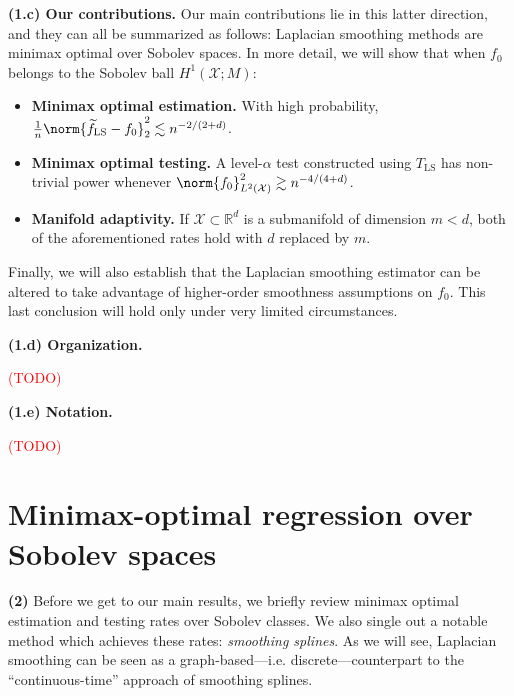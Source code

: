 \documentclass{article}
\newcommand{\Reals}{\mathbb{R}}
\newcommand{\1}{\mathbf{1}}
\newcommand{\Rd}{\Reals^d}
\newcommand{\Xset}{\mathcal{X}}
\newcommand{\Leb}{L}
\newcommand{\mc}[1]{\mathcal{#1}}
\newcommand{\wt}[1]{\widetilde{#1}}
\newcommand{\LS}{\mathrm{LS}}
\theoremstyle{alden}
\theoremstyle{aldenthm}
\theoremstyle{definition}
\theoremstyle{remark}
\begin{document}
\textbf{(1.c) Our contributions.} Our main contributions lie in this latter direction, and they can all be summarized as follows: Laplacian smoothing methods are minimax optimal over Sobolev spaces. In more detail, we will show that when $f_0$ belongs to the Sobolev ball $H^1(\Xset;M)$:
\begin{itemize}
	\item \textbf{Minimax optimal estimation.} With high probability, $\frac{1}{n}\norm{\wt{f}_{\LS} - f_0}_{2}^2 \lesssim n^{-2/(2 + d)}$.
	\item \textbf{Minimax optimal testing.}
	A level-$\alpha$ test constructed using $T_{\LS}$ has non-trivial power whenever $\norm{f_0}_{\Leb^2(\Xset)}^2 \gtrsim n^{-4/(4 + d)}$. 
	\item \textbf{Manifold adaptivity.}
	If $\mc{X} \subset \Rd$ is a submanifold of dimension $m < d$, both of the aforementioned rates hold with $d$ replaced by $m$.
\end{itemize}
Finally, we will also establish that the Laplacian smoothing estimator can be altered to take advantage of higher-order smoothness assumptions on $f_0$. This last conclusion will hold only under very limited circumstances.

\textbf{(1.d) Organization.}

\textcolor{red}{(TODO)}

\textbf{(1.e) Notation.}

\textcolor{red}{(TODO)}

\section{Minimax-optimal regression over Sobolev spaces}

\textbf{(2)} Before we get to our main results, we briefly review minimax optimal estimation and testing rates over Sobolev classes. We also single out a notable method which achieves these rates: \emph{smoothing splines}. As we will see, Laplacian smoothing can be seen as a graph-based---i.e. discrete---counterpart to the ``continuous-time'' approach of smoothing splines. 
\end{document}

